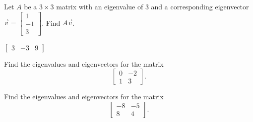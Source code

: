 \begin{exercise}[easy]
Let $A$ be a $3 \times 3$ matrix with an eigenvalue of 3 and a
corresponding eigenvector $\vec{v} =
\left[ \begin{smallmatrix} 1 \\ -1 \\ 3 \end{smallmatrix} \right]$.
Find $A \vec{v}$.
\end{exercise}
\comboSol{%
}
{%
$\left[\begin{smallmatrix} 3 & -3 & 9 \end{smallmatrix}\right]$
}

\begin{exercise}\ansMark%
Find the eigenvalues and eigenvectors for the matrix
\[ \begin{bmatrix} 0 & -2 \\ 1 & 3\end{bmatrix}. \]
\end{exercise}

\begin{exercise}\ansMark%
Find the eigenvalues and eigenvectors for the matrix
\[ \begin{bmatrix} -8 & -5 \\ 8 & 4\end{bmatrix}. \]
\end{exercise}

